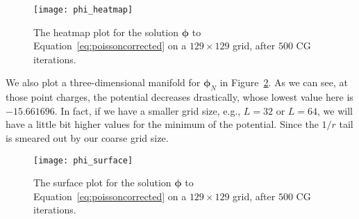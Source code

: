\begin{figure}[!hbt]
    \centering
    \texttt{[image: phi\_heatmap]}
    \caption{The heatmap plot for the solution \(\bm{\phi}\) to
        Equation~\eqref{eq:poissoncorrected} on a \(129 \times 129\) grid,
        after \(500\) CG iterations.}
    \label{fig:phi_heatmap}
\end{figure}

We also plot a three-dimensional manifold for \(\bm{\phi}_N\)
in Figure~\ref{fig:phi_surface}.
As we can see, at those point charges, the potential decreases drastically,
whose lowest value here is \(-15.661696\).
In fact, if we have a smaller grid size, e.g., \(L = 32\) or \(L = 64\),
we will have a little bit higher values for the minimum of the potential.
Since the \(1 / r\) tail is smeared out by our coarse grid size.

\begin{figure}[!hbt]
    \centering
    \texttt{[image: phi\_surface]}
    \caption{The surface plot for the solution \(\bm{\phi}\) to
        Equation~\eqref{eq:poissoncorrected} on a \(129 \times 129\) grid,
        after \(500\) CG iterations.}
    \label{fig:phi_surface}
\end{figure}
